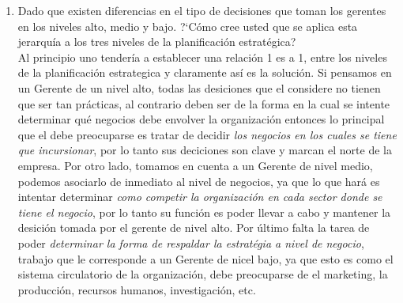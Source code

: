 \begin{itemize}
\begin{enumerate}
		\item Dado que existen diferencias en el tipo de decisiones que toman los gerentes en los niveles alto, medio y bajo. ?`C\'omo cree usted que se aplica esta jerarqu\'ia a los tres niveles de la planificaci\'on estrat\'egica?\\
		Al principio uno tender\'ia a establecer una relaci\'on 1 es a 1, entre los niveles de la planificaci\'on estrategica y claramente
		as\'i es la soluci\'on. Si pensamos en un Gerente de un nivel alto, todas las desiciones que el considere no tienen que ser tan 
		pr\'acticas, al contrario deben ser de la forma en la cual se intente determinar qu\'e negocios debe envolver la organizaci\'on
		entonces lo principal que el debe preocuparse es tratar de decidir \emph{los negocios en los cuales se tiene que incursionar}, por
		lo tanto sus deciciones son clave y marcan el norte de la empresa.
		Por otro lado, tomamos en cuenta a un Gerente de nivel medio, podemos asociarlo de inmediato al nivel de negocios, ya que lo que har\'a
		es intentar determinar \emph{como competir la organizaci\'on en cada sector donde se tiene el negocio}, por lo tanto su funci\'on es poder
		llevar a cabo y mantener la desici\'on tomada por el gerente de nivel alto.
		Por \'ultimo falta la tarea de poder \emph{determinar la forma de respaldar la estrat\'egia a nivel de negocio}, trabajo que le
		corresponde a un Gerente de nicel bajo, ya que esto es como el sistema circulatorio de la organizaci\'on, debe preocuparse de
		el marketing, la producci\'on, recursos humanos, investigaci\'on, etc.


\end{enumerate}
\end{itemize}
